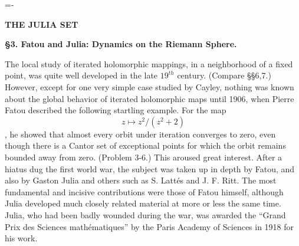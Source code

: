 

\def\GO{{G\!O}}
\def\TF{{\cal E}}
\def\T{{\bf T}}

\footline={\hss{}-\folio\hss}

\centerline{\bf THE JULIA SET}\medskip

\centerline{\bf \S3. Fatou and Julia: Dynamics on the Riemann Sphere.}\bigskip

The local study of iterated holomorphic mappings, in a neighborhood of
a fixed point, was quite well developed in the late $19^{th}$ century.
(Compare \S\S6,7.) However, except for one very simple case studied
by Cayley, nothing was known about the global behavior of iterated
holomorphic maps
until 1906, when Pierre Fatou described the following startling example.
For the map \[z\mapsto z^2/(z^2+2)\], he showed that
almost every orbit under iteration
converges to zero, even though there is a Cantor set of exceptional points
for which the orbit remains bounded away from zero. (Problem 3-6.)
This aroused great interest. After a hiatus dug
the first world war, the subject was taken up in depth by Fatou, and also
by Gaston Julia and others such as S. Latt\'es and J. F. Ritt. The most
fundamental and incisive contributions were those of Fatou himself,
although Julia developed much closely related material at more or less the
same time. Julia, who had been badly wounded
during the war, was awarded the ``Grand Prix des Sciences math\'ematiques''
by the Paris Academy of Sciences in 1918 for his work.\medskip

